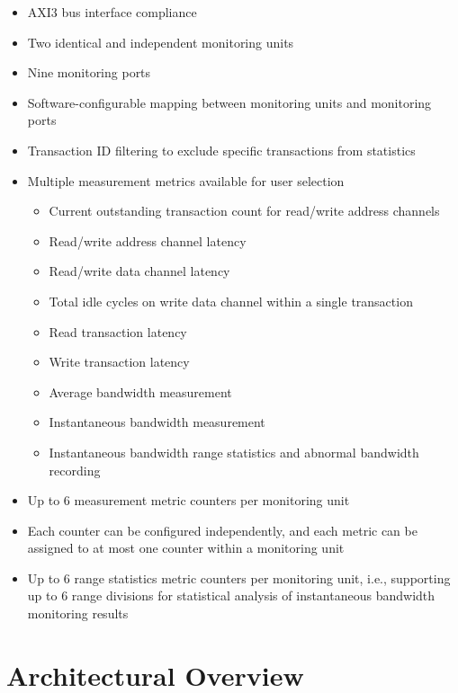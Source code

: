 \documentclass[main\_\_EN.tex]{subfiles}
\begin{document}
\begin{itemize}
    \item AXI3 bus interface compliance
    \item Two identical and independent monitoring units
    \item Nine monitoring ports
    \item Software-configurable mapping between monitoring units and monitoring ports
    \item Transaction ID filtering to exclude specific transactions from statistics
    \item Multiple measurement metrics available for user selection
        \begin{itemize}
          \item Current outstanding transaction count for read/write address channels
          \item Read/write address channel latency
          \item Read/write data channel latency   
          \item Total idle cycles on write data channel within a single transaction
          \item Read transaction latency
          \item Write transaction latency     
          \item Average bandwidth measurement
          \item Instantaneous bandwidth measurement
          \item Instantaneous bandwidth range statistics and abnormal bandwidth recording
        \end{itemize}
    
    \item Up to 6 measurement metric counters per monitoring unit
    \item Each counter can be configured independently, and each metric can be assigned to at most one counter within a monitoring unit
    \item Up to 6 range statistics metric counters per monitoring unit, i.e., supporting up to 6 range divisions for statistical analysis of instantaneous bandwidth monitoring results


\end{itemize}


\section{Architectural Overview}
\label{sec:aximon-arch-overview}
\end{document}
